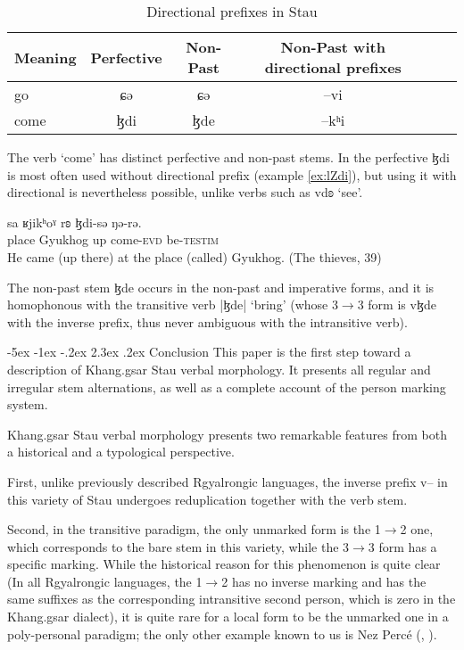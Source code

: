 \documentclass[oldfontcommands,twoside,12pt]{memoir}
\makeatletter
\newcommand{\ipa}[1]{{\phon #1}} %
\renewcommand\section{\@startsection{section}{0}{\z@}%
                                   {-5ex \@plus -1ex \@minus -.2ex}%
                                   {2.3ex \@plus.2ex}%
                                   {\flushleft\large\bfseries}}
\makeatother
\begin{document}
\begin{table}[H]
\centering
\begin{tabular}{lccccc}
\toprule
Meaning & Perfective & Non-Past & Non-Past with directional prefixes \\
\midrule
go & \ipa{ɕə} &\ipa{ɕə} & \ipa{--vi} \\
come & \ipa{ɮdi} &\ipa{ɮde} & \ipa{--kʰi} \\
\bottomrule
\end{tabular}
\caption{Directional prefixes in Stau} \label{tab:motion.irr} 
\end{table}

The verb `come' has distinct perfective and non-past stems. In the perfective \ipa{ɮdi} is most often used   without directional prefix (example \ref{ex:lZdi}), but using it with directional is nevertheless possible, unlike verbs such as \ipa{vdʚ} `see'.

\begin{exe}
\ex \label{ex:lZdi}
\gll 
\ipa{sa}  	\ipa{ʁjikʰoˠ}  	\ipa{rʚ}  	\ipa{ɮdi-sə}  	\ipa{ŋə-rə.}   \\
place Gyukhog up come-\textsc{evd} be-\textsc{testim} \\
\glt He came (up there) at the place (called) Gyukhog. (The thieves, 39)
\end{exe}

The non-past stem \ipa{ɮde} occurs in the non-past and imperative forms, and it is homophonous with the transitive verb |\ipa{ɮde}| `bring' (whose 3$\rightarrow$3 form is \ipa{vɮde} with the inverse prefix, thus never ambiguous with the intransitive verb).

 
\section{Conclusion}
This paper is the first step toward a description of Khang.gsar Stau verbal morphology. It presents all regular and irregular stem alternations, as well as a complete account of the person marking system.

Khang.gsar Stau verbal morphology presents two remarkable features  from both a historical and a typological perspective.

First, unlike previously described Rgyalrongic languages, the inverse prefix \ipa{v}-- in this variety of Stau undergoes reduplication together with the verb stem. 

Second, in the transitive paradigm, the only unmarked form is the 1$\rightarrow$2 one, which corresponds to the bare stem in this variety, while the 3$\rightarrow$3 form has a specific marking. While the historical reason for this phenomenon is quite clear (In all Rgyalrongic languages, the 1$\rightarrow$2 has no inverse marking and has the same suffixes as the corresponding intransitive second person, which is zero in the Khang.gsar dialect), it is quite rare for a local form to be the unmarked one in a poly-personal paradigm; the only other example known to us is Nez Percé (\citealt{Rude1997}, \citealt[166-167]{zuniga06}).
\end{document}
